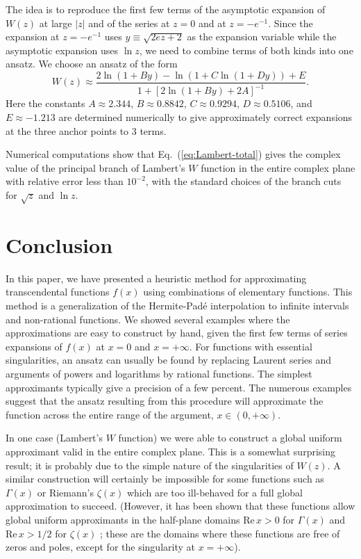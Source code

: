 \documentclass{llncs}
\begin{document}
The idea is to reproduce the first few terms of the asymptotic expansion
of $W\left(z\right)$ at large $\left|z\right|$ and of the series
at $z=0$ and at $z=-e^{-1}$. Since the expansion at $z=-e^{-1}$
uses $y\equiv \sqrt{2ez+2}$ as the expansion variable while the asymptotic
expansion uses $\ln z$, we need to combine terms of both kinds into
one ansatz. We choose an ansatz of the form\begin{equation}
W\left(z\right)\approx \frac{2\ln \left(1+By\right)-\ln \left(1+C\ln \left(1+Dy\right)\right)+E}{1+\left[2\ln \left(1+By\right)+2A\right]^{-1}}.\label{eq:Lambert-total}\end{equation}
Here the constants $A\approx 2.344$, $B\approx 0.8842$, $C\approx 0.9294$,
$D\approx 0.5106$, and $E\approx -1.213$ are determined numerically
to give approximately correct expansions at the three anchor points
to 3 terms.

Numerical computations show that Eq.~(\ref{eq:Lambert-total}) gives
the complex value of the principal branch of Lambert's $W$ function
in the entire complex plane with relative error less than $10^{-2}$,
with the standard choices of the branch cuts for $\sqrt{z}$ and $\ln z$.


\section{Conclusion}

In this paper, we have presented a heuristic method for approximating
transcendental functions $f\left(x\right)$ using combinations of
elementary functions. This method is a generalization of the Hermite-Pad\'e
interpolation to infinite intervals and non-rational functions. We
showed several examples where the approximations are easy to construct
by hand, given the first few terms of series expansions of $f\left(x\right)$
at $x=0$ and $x=+\infty $. For functions with essential singularities,
an ansatz can usually be found by replacing Laurent series and arguments
of powers and logarithms by rational functions. The simplest approximants
typically give a precision of a few percent. The numerous examples
suggest that the ansatz resulting from this procedure will approximate
the function across the entire range of the argument, $x\in \left(0,+\infty \right)$.

In one case (Lambert's $W$ function) we were able to construct a
global uniform approximant valid in the entire complex plane. This
is a somewhat surprising result; it is probably due to the simple
nature of the singularities of $W\left(z\right)$. A similar construction
will certainly be impossible for some functions such as $\Gamma \left(x\right)$
or Riemann's $\zeta \left(x\right)$ which are too ill-behaved for
a full global approximation to succeed. (However, it has been shown
that these functions allow global uniform approximants in the half-plane
domains $\textrm{Re}\, x>0$ for $\Gamma \left(x\right)$ \cite{LanczosSpouge}
and $\textrm{Re}\, x>1/2$ for $\zeta \left(x\right)$ \cite{B93};
these are the domains where these functions are free of zeros and
poles, except for the singularity at $x=+\infty $).
\end{document}
